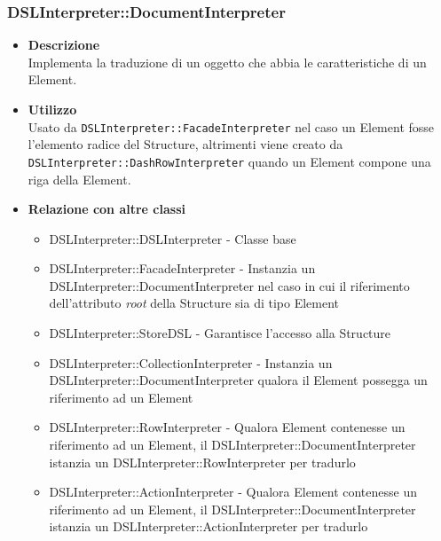 \subsubsection{DSLInterpreter::DocumentInterpreter}
\begin{itemize}
\item \textbf{Descrizione} \hfill \\
  Implementa la traduzione di un oggetto che abbia le caratteristiche di un  Element.
\item \textbf{Utilizzo} \hfill \\
Usato da \texttt{DSLInterpreter::FacadeInterpreter} nel caso un  Element fosse l'elemento radice del  Structure, altrimenti viene creato da \\\texttt{DSLInterpreter::DashRowInterpreter} quando un  Element compone una riga della  Element.
\item \textbf{Relazione con altre classi}
  \begin{itemize}
  \item DSLInterpreter::DSLInterpreter - Classe base
  \item DSLInterpreter::FacadeInterpreter - Instanzia un DSLInterpreter::DocumentInterpreter nel caso in cui il riferimento dell'attributo \textit{root} della  Structure sia di tipo  Element
  \item DSLInterpreter::StoreDSL - Garantisce l'accesso alla  Structure
  \item DSLInterpreter::CollectionInterpreter - Instanzia un DSLInterpreter::DocumentInterpreter qualora il  Element possegga un riferimento ad un  Element
  \item DSLInterpreter::RowInterpreter - Qualora  Element contenesse un riferimento ad un  Element, il DSLInterpreter::DocumentInterpreter istanzia un DSLInterpreter::RowInterpreter per tradurlo
  \item DSLInterpreter::ActionInterpreter - Qualora  Element contenesse un riferimento ad un  Element, il DSLInterpreter::DocumentInterpreter istanzia un DSLInterpreter::ActionInterpreter per tradurlo
  \end{itemize}
\end{itemize}

